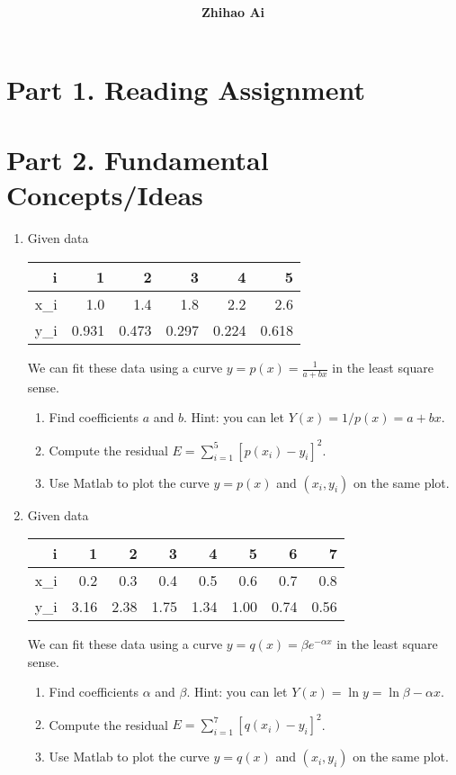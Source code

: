 \documentclass[10pt]{report}
\title{
	\vspace{2in}
	\textmd{\textbf{\hwCourse\\\hwTitle}}\\
	\vspace{0.3in}\large{\textit{\hmwkClassInstructor}}
	\vspace{3in}
}
\author{\textbf{Zhihao Ai}}
\date{}
\begin{document}
\maketitle

\section*{Part 1. Reading Assignment}

\section*{Part 2. Fundamental Concepts/Ideas}
\begin{enumerate}
	\item 
	Given data
	\begin{table}[H]
		\centering
		\begin{tabular}{*{6}{N}} \toprule
			i & 1 & 2 & 3 & 4 & 5 \\ \midrule
			x_i & 1.0 & 1.4 & 1.8 & 2.2 & 2.6\\
			y_i & 0.931 & 0.473 & 0.297 & 0.224 & 0.618\\
			\bottomrule
		\end{tabular}
	\end{table}
	We can fit these data using a curve $y=p(x)=\frac{1}{a+bx}$ in the least square sense.
	\begin{enumerate}
		\item 
		Find coefficients $a$ and $b$. Hint: you can let $Y(x)=1/p(x)=a+bx$.
		
		\item 
		Compute the residual $E = \sum_{i=1}^{5} [p(x_i) - y_i]^2$.
		
		\item 
		Use Matlab to plot the curve $y=p(x)$ and $(x_i, y_i)$ on the same plot.
	\end{enumerate}

	\item 
	Given data
	\begin{table}[H]
		\centering
		\begin{tabular}{*{8}{N}} \toprule
			i & 1 & 2 & 3 & 4 & 5 & 6 & 7 \\ \midrule
			x_i & 0.2 & 0.3 & 0.4 & 0.5 & 0.6 & 0.7 & 0.8\\
			y_i & 3.16 & 2.38 & 1.75 & 1.34 & 1.00 & 0.74 & 0.56\\
			\bottomrule
		\end{tabular}
	\end{table}
	We can fit these data using a curve $y=q(x)=\beta e^{-\alpha x}$ in the least square sense.
	\begin{enumerate}
		\item 
		Find coefficients $\alpha$ and $\beta$. Hint: you can let $Y(x)=\ln y=\ln \beta - \alpha x$.
		
		\item 
		Compute the residual $E = \sum_{i=1}^{7} [q(x_i) - y_i]^2$.
		
		\item 
		Use Matlab to plot the curve $y=q(x)$ and $(x_i, y_i)$ on the same plot.
	\end{enumerate}
\end{enumerate}
\end{document}
